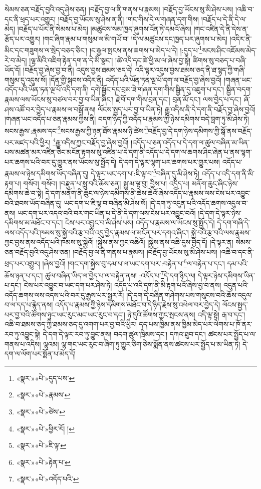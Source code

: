 སེམས་ཅན་བརྗོད་བྱའི་འདུ་ཤེས་ཅན། །བརྗོད་བྱ་ལ་ནི་གནས་པ་རྣམས། །བརྗོད་བྱ་ཡོངས་སུ་མི་ཤེས་པས། །འཆི་བ་དང་ནི་ཕྲད་པར་འགྱུར། །བརྗོད་བྱ་ཡོངས་སུ་ཤེས་ན་ནི། །གང་གིས་དེ་ལ་གཞན་དག་གིས། །བརྗོད་པ་དེ་ནི་དེ་ལ་མེད། །བརྗོད་པ་པོར་ནི་སེམས་པ་མེད། །མཚུངས་སམ་ཁྱད་ཞུགས་འོན་ཏེ་དམའོ་ཞེས། །གང་འཛིན་དེ་ནི་དེས་ན་རྩོད་པར་འགྱུར། །གང་ཞིག་རྣམ་པ་གསུམ་ལ་མི་གཡོ་བ། །དེ་ལ་མཚུངས་དང་ཁྱད་པར་ཞུགས་པ་མེད། །འདིར་ནི་མིང་དང་གཟུགས་ལ་སྲེད་བཅད་ཅིང་། །ང་རྒྱལ་སྤངས་ནས་ཆགས་པ་མེད་པ་དེ། །:དུད་པ་\footnote{«སྣར་»«པེ་»དུད་པས་}སངས་ཤིང་འཇོམས་མེད་རེ་བ་མེད། །ལྷ་མིའི་འཇིག་རྟེན་དག་ན་དེ་མི་སྣང་། །ཚེ་འདི་དང་ཚེ་ཕྱི་མ་ལ་ཞེས་བྱ་སྟེ། ཚིགས་སུ་བཅད་པ་བཞི་ཡོད་དོ། །བརྗོད་བྱ་ཞེས་བྱ་བ་ནི། འདུས་བྱས་ཐམས་ཅད་དེ། འདི་ལྟར་འདུས་བྱས་ཐམས་ཅད་ནི་ཐ་སྙད་ཀྱི་གཞི་གསུམ་དུ་འདུས་སོ། །དོན་གྱི་སྐབས་འདིར་ནི། འདོད་པའི་ཡོན་ཏན་ལྔ་པོ་དག་ལ་བརྗོད་བྱ་ཞེས་བྱའོ། །གཞན་ཡང་འདོད་པའི་ཡོན་ཏན་ལྔ་པོ་འདི་དག་ནི། དགེ་སྦྱོང་དང་བྲམ་ཟེ་གཞན་དག་གིས་སྦྱིན་དུ་འཇུག་པ་དང་། སྦྱིན་བདག་རྣམས་ལས་ཡོངས་སུ་བཙལ་བར་བྱ་བ་ཡིན་ཞིང་། རྗེ་བོ་དག་གིས་བྲན་དང་། བྲན་མོ་དང་། ལས་བྱེད་པ་དང་། ཞོ་ཤས་འཚོ་བར་བྱེད་པ་རྣམས་ལ་བསྒོ་ནས། ལོངས་སྤྱད་པར་བྱ་བ་ཡིན་ཏེ། རྒྱུ་འདིས་ནི་དེ་དག་ནི་བརྗོད་བྱ་ཞེས་བྱའོ། །གཞན་ཡང་འདོད་པ་ཅན་རྣམས་ཀྱིས་ནི། བདག་ཉིད་ཀྱི་འདོད་པ་རྣམས་ཀྱི་ཉེས་དམིགས་བདེ་བླག་ཏུ་མི་ཤེས་ཏེ། སངས་རྒྱས་:རྣམས་དང་\footnote{«སྣར་»«པེ་»རྣམས་}སངས་རྒྱས་ཀྱི་ཉན་ཐོས་རྣམས་ཉི་ཚེས་\footnote{«སྣར་»«པེ་»ཙེས་}བརྗོད་བྱ་དེ་དག་ཉེས་དམིགས་ཀྱི་སྒོ་ནས་བརྗོད་པར་མཛད་པའི་ཕྱིར། \footnote{«སྣར་»«པེ་»ཕྱིར་རོ། ། }རྒྱུ་འདིས་ཀྱང་བརྗོད་བྱ་ཞེས་བྱའོ། །འདོད་པ་ཅན་འདོད་པ་དེ་དག་ལ་ཚུལ་བཞིན་མ་ཡིན་པས་མཚན་མར་འཛིན་ཅིང་མངོན་རྟགས་སུ་འཛིན་པ་དེ་དག་ནི་འདོད་པ་དེ་དག་ལ་ཆགས་ཤིང་ཞེན་པ་ནས་ལྷག་པར་ཆགས་པའི་བར་དུ་གྱུར་ནས་ཡོངས་སུ་སྤྱོད་དེ། དེ་དག་དེ་ལྟར་ལྷག་པར་ཆགས་པར་གྱུར་པས། འདོད་པ་རྣམས་ལ་ཉེས་དམིགས་ཡོད་བཞིན་དུ། དེ་ལྟར་ཡང་དག་པ་:ཇི་ལྟ་བ་\footnote{«སྣར་»«པེ་»ཇི་ལྟ་}བཞིན་དུ་མི་ཤེས་ཏེ། འདོད་པ་འདི་དག་ནི་མི་རྟག་པ། གསོབ། གསོབ། །བརྫུན་པ་སླུ་བའི་ཆོས་ཅན། སྒྱུ་མ་ལྟ་བུ། བྱིས་པ། འདྲིད་པ། མནོག་ཆུང་ཞིང་ཉེས་དམིགས་ཆེ་བ་སྟེ། དེ་དག་མནོག་ནི་ཆུང་ལ་ཉེས་དམིགས་ནི་ཆེས་ཆེའོ་ཞེས་འདོད་པ་རྣམས་ལས་ངེས་པར་འབྱུང་བའི་ཐབས་ཡོད་བཞིན་དུ། ཡང་དག་པ་ཇི་ལྟ་བ་བཞིན་མི་ཤེས་སོ། །དེ་དག་ཏུ་འདུན་པའི་འདོད་ཆགས་འདུལ་བ་ནས། ཡང་དག་པར་འདའ་བའི་བར་གང་ཡིན་པ་དེ་ནི་དེ་དག་ལས་ངེས་པར་འབྱུང་བའོ། །དེ་དག་དེ་ལྟར་ཉེས་དམིགས་མ་མཐོང་བ་དང་། ངེས་པར་འབྱུང་བ་མི་ཤེས་པས། འདོད་པ་རྣམས་ལ་ཡོངས་སུ་སྤྱོད་དེ། དེ་དག་གཞི་དེ་ལས་འདོད་པའི་ཁམས་སུ་སྐྱེ་བའི་རྩ་བའི་འདུ་བྱེད་རྣམས་ལ་མངོན་པར་དགའ་ཞིང་། སྐྱེ་བའི་རྩ་བའི་ལས་རྣམས་ཀྱང་བྱས་ནས་འདོད་པའི་ཁམས་སུ་སྐྱེའོ། །སྐྱེས་ནས་ཀྱང་འཆིའོ། །སྐྱེས་ནས་འཆི་དུས་བྱེད་དོ། །དེ་ལྟར་ན། སེམས་ཅན་བརྗོད་བྱའི་འདུ་ཤེས་ཅན། །བརྗོད་བྱ་ལ་ནི་གནས་པ་རྣམས། །བརྗོད་བྱ་ཡོངས་སུ་མི་ཤེས་པས། །འཆི་བ་དང་ནི་ཕྲད་པར་འགྱུར། །ཞེས་བྱའོ། །གང་དག་སྐྱེས་བུ་དམ་པ་ལ་ཡང་དག་པར་:བརྟེན་པ་\footnote{«སྣར་»«པེ་»རྟེན་པ་}ལ་བརྟེན་པ་དང་། དམ་པའི་ཆོས་ཉན་པ་དང་། ཚུལ་བཞིན་ཡིད་ལ་བྱེད་པ་ལ་བརྟེན་ནས། :འདོད་པ་\footnote{«སྣར་»«པེ་»འདོད་པའི་}དེ་དག་ཉིད་ལ། དེ་ལྟར་ཉེས་དམིགས་ཡིན་པ་དང་། ངེས་པར་འབྱུང་བ་ཡང་དག་པར་ཤེས་ཏེ། འདོད་པ་འདི་དག་ནི་མི་རྟག་པའོ་ཞེས་བྱ་བ་ནས། འདུན་པའི་འདོད་ཆགས་ལས་འདས་པའི་བར་དུ་རྒྱས་པར་སྦྱར་རོ། །དེ་དག་དེ་བཞིན་གཤེགས་པས་གསུངས་བའི་ཆོས་འདུལ་བ་ལ་དད་པ་རྙེད་ནས། འདོད་པ་རྣམས་ཀྱི་ཉེས་དམིགས་མཐོང་བ་དེ་ཉིད་རྗེས་སུ་འཕེལ་བར་བྱེད་དེ། ལོངས་སྤྱད་པར་བྱ་བའི་ཚོགས་ཉུང་ཡང་རུང་མང་ཡང་རུང་བ་དང་། ཉེ་དུའི་ཚོགས་ཀྱང་སྤངས་ནས། འདི་ལྟ་སྟེ། རྒ་བ་དང་། འཆི་བ་ཐམས་ཅད་ཀྱི་ཐམས་ཅད་དུ་འགག་པར་བྱ་བའི་ཕྱིར། དད་པས་ཁྱིམ་ནས་ཁྱིམ་མེད་པར་ལེགས་པ་ཁོ་ནར་རབ་ཏུ་འབྱུང་སྟེ། དེ་དག་དེ་ལྟར་རབ་ཏུ་བྱུང་ནས། བདག་ཚུལ་ཁྲིམས་དང་། དཀའ་ཐུབ་དང་། ཚངས་པར་སྤྱོད་པ་ལ་གནས་པ་འདིས། ལྷའམ། ལྷ་གང་ཡང་རུང་བ་ཞིག་ཏུ་གྱུར་ཅིག་ཅེས་སྨོན་ནས་ཚངས་པར་སྤྱོད་པ་མ་ཡིན་ཏེ། དེ་དག་ལ་ལོག་པར་སྨོན་པ་མེད་དོ། 